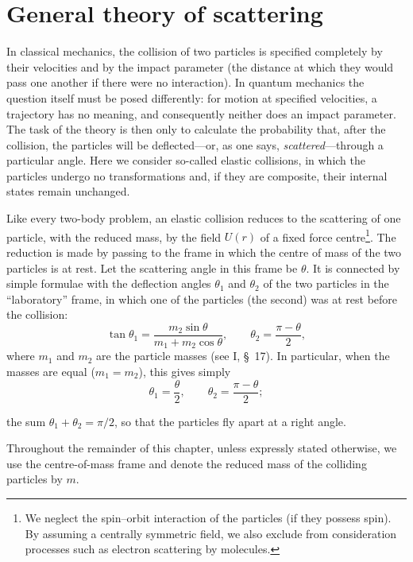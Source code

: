 \section{General theory of scattering}

In classical mechanics, the collision of two particles is specified completely
by their velocities and by the impact parameter (the distance at which they
would pass one another if there were no interaction). In quantum mechanics the
question itself must be posed differently: for motion at specified velocities,
a trajectory has no meaning, and consequently neither does an impact
parameter. The task of the theory is then only to calculate the probability
that, after the collision, the particles will be deflected---or, as one says,
\emph{scattered}---through a particular angle. Here we consider so-called
elastic collisions, in which the particles undergo no transformations and, if
they are composite, their internal states remain unchanged.

Like every two-body problem, an elastic collision reduces to the scattering of
one particle, with the reduced mass, by the field $U(r)$ of a fixed force
centre\footnote{We neglect the spin--orbit interaction of the particles (if
they possess spin). By assuming a centrally symmetric field, we also exclude
from consideration processes such as electron scattering by molecules.}. The
reduction is made by passing to the frame in which the centre of mass of the
two particles is at rest. Let the scattering angle in this frame be $\theta$.
It is connected by simple formulae with the deflection angles $\theta_1$ and
$\theta_2$ of the two particles in the ``laboratory'' frame, in which one of
the particles (the second) was at rest before the collision:
\begin{equation}
 \tan\theta_1=\frac{m_2\sin\theta}{m_1+m_2\cos\theta},\qquad
 \theta_2=\frac{\pi-\theta}{2},
 \tag{123.1}
\end{equation}
where $m_1$ and $m_2$ are the particle masses (see I, \S~17). In particular,
when the masses are equal ($m_1=m_2$), this gives simply
\begin{equation}
 \theta_1=\frac\theta2,\qquad \theta_2=\frac{\pi-\theta}{2};
 \tag{123.2}
\end{equation}

the sum $\theta_1+\theta_2=\pi/2$, so that the particles fly apart at a right
angle.

Throughout the remainder of this chapter, unless expressly stated otherwise,
we use the centre-of-mass frame and denote the reduced mass of the colliding
particles by $m$.

